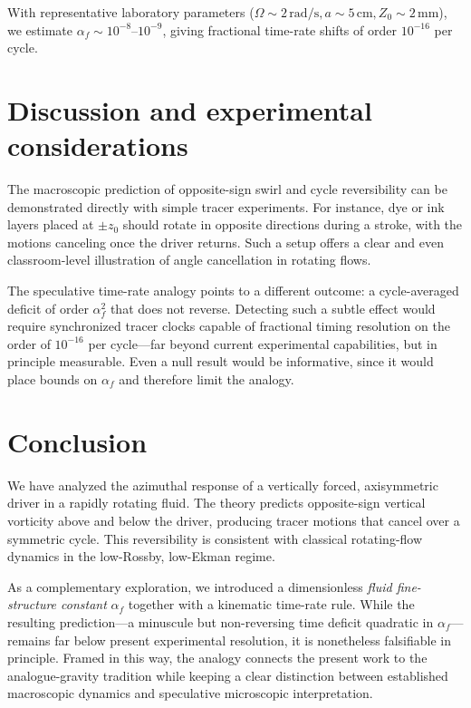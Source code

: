 \documentclass[12pt]{article}
\begin{document}
    With representative laboratory parameters
    (\(\Omega\sim2\,\mathrm{rad/s}, a\sim5\,\mathrm{cm}, Z_0\sim2\,\mathrm{mm}\)),
    we estimate $\alpha_f \sim 10^{-8}$--$10^{-9}$,
    giving fractional time-rate shifts of order $10^{-16}$ per cycle.

    \section{Discussion and experimental considerations}

    The macroscopic prediction of opposite-sign swirl and cycle reversibility can be demonstrated directly with simple tracer experiments. For instance, dye or ink layers placed at $\pm z_0$ should rotate in opposite directions during a stroke, with the motions canceling once the driver returns. Such a setup offers a clear and even classroom-level illustration of angle cancellation in rotating flows.

    The speculative time-rate analogy points to a different outcome: a cycle-averaged deficit of order $\alpha_f^2$ that does not reverse. Detecting such a subtle effect would require synchronized tracer clocks capable of fractional timing resolution on the order of $10^{-16}$ per cycle—far beyond current experimental capabilities, but in principle measurable. Even a null result would be informative, since it would place bounds on $\alpha_f$ and therefore limit the analogy.

    \section*{Conclusion}

    We have analyzed the azimuthal response of a vertically forced, axisymmetric driver in a rapidly rotating fluid. The theory predicts opposite-sign vertical vorticity above and below the driver, producing tracer motions that cancel over a symmetric cycle. This reversibility is consistent with classical rotating-flow dynamics in the low-Rossby, low-Ekman regime.

    As a complementary exploration, we introduced a dimensionless \emph{fluid fine-structure constant} $\alpha_f$ together with a kinematic time-rate rule. While the resulting prediction—a minuscule but non-reversing time deficit quadratic in $\alpha_f$—remains far below present experimental resolution, it is nonetheless falsifiable in principle. Framed in this way, the analogy connects the present work to the analogue-gravity tradition while keeping a clear distinction between established macroscopic dynamics and speculative microscopic interpretation.
\end{document}
